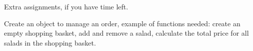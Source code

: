 \documentclass[fleqn, article, a4paper]{memoir}
\begin{document}
\begin{Assignments}

\end{Assignments}

\noindent Extra assignments, if you have time left.
\begin{Assignments}

\item Create an object to manage an order, example of functions needed: create an empty shopping basket, add and remove a salad, calculate the total price for all salads in the shopping basket.

\end{Assignments}


\end{document}
